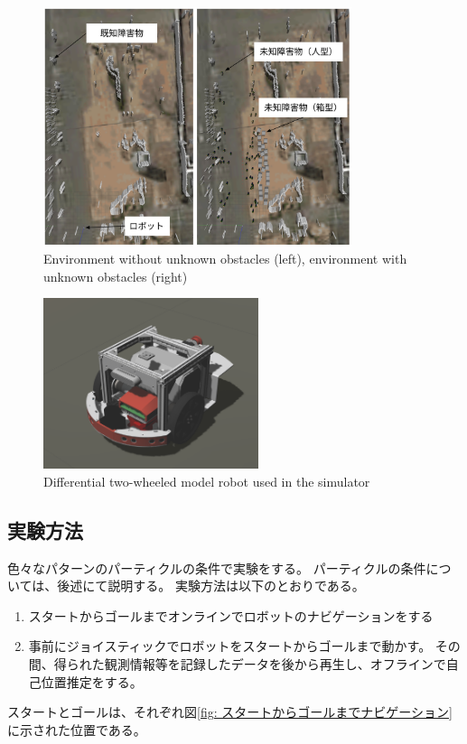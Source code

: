 \documentclass{jarticle}
\begin{document}
\begin{figure}[htbp]
  \centering
   \includegraphics[height=70mm]{fig/environment_comparison.png}
   \vspace*{-4mm}
   \caption{Environment without unknown obstacles (left), environment with unknown obstacles (right)}
   \label{fig: つくばチャレンジ人混みシミュレータ}
\end{figure}

\begin{figure}[htbp]
  \centering
   \includegraphics[height=50mm]{fig/raspicat_gazebo.png}
   \vspace*{-4mm}
   \caption{Differential two-wheeled model robot used in the simulator}
   \label{fig: raspicat}
\end{figure}

\subsection{実験方法}

色々なパターンのパーティクルの条件で実験をする。
パーティクルの条件については、後述にて説明する。
実験方法は以下のとおりである。
\noindent
\begin{enumerate}[A]
  \item スタートからゴールまでオンラインでロボットのナビゲーションをする
  \item 事前にジョイスティックでロボットをスタートからゴールまで動かす。
        その間、得られた観測情報等を記録したデータを後から再生し、オフラインで自己位置推定をする。
\end{enumerate}
\noindent
スタートとゴールは、それぞれ図\ref{fig: スタートからゴールまでナビゲーション}
に示された位置である。
\end{document}
